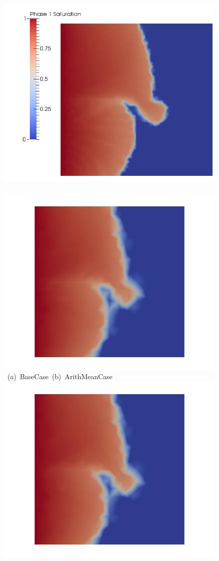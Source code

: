 \begin{landscape}
\begin{figure}[ht] 
\vbox{\vspace{-1cm}
\hbox{\hspace{4cm} \includegraphics[width=.56\textwidth]{./Pics/BaseCase/BaseCase_Saturation_t_1dot15withlegend.png}
      \hspace {1.5cm} \includegraphics[width=.56\textwidth]{./Pics/ArithMeanCase/ArithMeanCase_Saturation_t_1dot15.png}}
\vspace{0.cm}
\hbox{\hspace{7.0cm} (a) BaseCase \hspace{5.75cm} (b) ArithMeanCase}
\vspace{0.5cm}
\hbox{
      \includegraphics[width=.56\textwidth]{./Pics/HarmMeanCase/HarmMeanCase_Saturation_t_1dot15.png}
}}
\end{figure}
\end{landscape}
